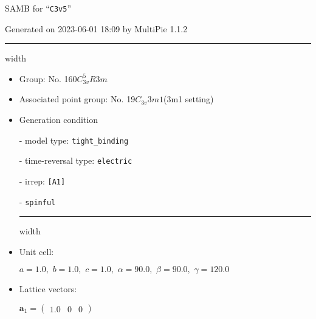 \documentclass[fleqn,10pt,landscape]{article}
\begin{document}
\setcounter{MaxMatrixCols}{16}

\setlength{\baselineskip}{16pt}
\footnotesize
\begin{center}
\LARGE
SAMB for ``\texttt{C3v5}''
\end{center}
\begin{flushright}
Generated on 2023-06-01 18:09 by MultiPie 1.1.2
\end{flushright}
\vspace{1cm}


 \hfil \hrule height 1mm width \textwidth \hfil

\begin{itemize}
\item Group: No. 160\quad$C_{3v}^{5}$\quad$R3m$\quad[ trigonal ]

\item Associated point group: No. 19\quad$C_{3v}$\quad$3m1$\quad(3m1 setting)\quad[ trigonal ]

\vspace{5mm}

\item Generation condition

\quad - model type: \texttt{tight_binding}

\quad - time-reversal type: \texttt{electric}

\quad - irrep: \texttt{[A1]}

\quad - \texttt{spinful}


 \hfil \hrule height 1mm width \textwidth \hfil

\item Unit cell:

\quad $a=1.0,\,\, b=1.0,\,\, c=1.0,\,\, \alpha=90.0,\,\, \beta=90.0,\,\, \gamma=120.0$

\item Lattice vectors:

\quad $\bm{a}_1=\begin{pmatrix} 1.0 & 0 & 0 \end{pmatrix}$


\end{itemize}
\end{document}
